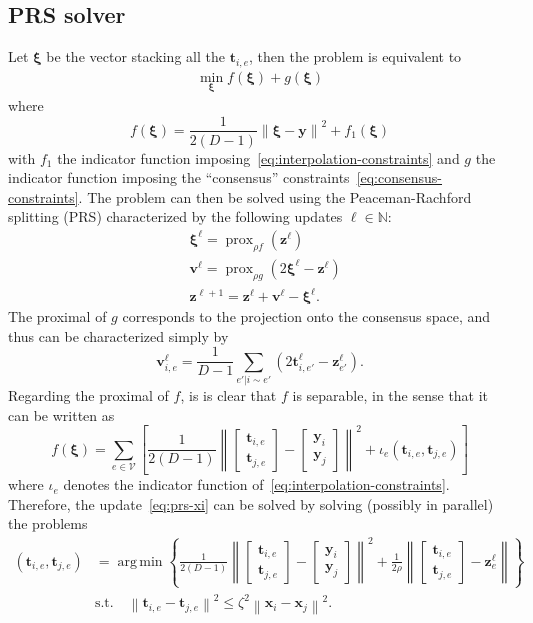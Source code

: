 \documentclass{article}
\DeclareMathOperator*{\argmin}{arg\,min}
\DeclareMathOperator{\prox}{prox}
\newcommand{\norm}[1]{\left\lVert#1\right\rVert}
\newcommand{\tv}{\mathbold{t}}
\newcommand{\x}{\mathbold{x}}
\newcommand{\y}{\mathbold{y}}
\newcommand{\vv}{\mathbold{v}}
\newcommand{\z}{\mathbold{z}}
\newcommand{\xx}{\pmb{\xi}}
\begin{document}
\subsection{PRS solver}
Let $\xx$ be the vector stacking all the $\tv_{i,e}$, then the problem is equivalent to
\begin{align*}
	\min_{\xx} f(\xx) + g(\xx)
\end{align*}
where
$$
	f(\xx) = \frac{1}{2(D-1)} \norm{\xx - \y}^2 + f_1(\xx)
$$
with $f_1$ the indicator function imposing~\eqref{eq:interpolation-constraints} and $g$ the indicator function imposing the ``consensus'' constraints~\eqref{eq:consensus-constraints}. The problem can then be solved using the Peaceman-Rachford splitting (PRS) characterized by the following updates $\ell \in \mathbb{N}$:
\begin{subequations}
\begin{align}
	&\xx^\ell = \prox_{\rho f}(\z^\ell) \label{eq:prs-xi} \\
	&\vv^\ell = \prox_{\rho g}(2 \xx^\ell - \z^\ell) \\
	&\z^{\ell+1} = \z^\ell + \vv^\ell - \xx^\ell.
\end{align}
\end{subequations}
The proximal of $g$ corresponds to the projection onto the consensus space, and thus can be characterized simply by
$$
	\vv_{i,e}^\ell = \frac{1}{D-1} \sum_{e' | i \sim e'} \left( 2 \tv_{i,e'}^\ell - \z_{e'}^\ell\right).
$$
Regarding the proximal of $f$, is is clear that $f$ is separable, in the sense that it can be written as
$$
	f(\xx) = \sum_{e \in \mathcal{V}} \left[ \frac{1}{2 (D-1)} \norm{\begin{bmatrix} \tv_{i,e} \\ \tv_{j,e} \end{bmatrix} - \begin{bmatrix} \y_i \\ \y_j \end{bmatrix}}^2 + \iota_{e}(\tv_{i,e},\tv_{j,e}) \right]
$$
where $\iota_{e}$ denotes the indicator function of~\eqref{eq:interpolation-constraints}. Therefore, the update~\eqref{eq:prs-xi} can be solved by solving (possibly in parallel) the problems
\begin{equation}\label{eq:local-updates}
\begin{split}
	(\tv_{i,e},\tv_{j,e}) &= \argmin \left\{ \frac{1}{2 (D-1)} \norm{\begin{bmatrix} \tv_{i,e} \\ \tv_{j,e} \end{bmatrix} - \begin{bmatrix} \y_i \\ \y_j \end{bmatrix}}^2 + \frac{1}{2\rho} \norm{\begin{bmatrix} \tv_{i,e} \\ \tv_{j,e} \end{bmatrix} - \z_e^\ell} \right\}\\
	&\text{s.t.} \quad \norm{\tv_{i,e} - \tv_{j,e}}^2 \leq \zeta^2 \norm{\x_i - \x_j}^2.
\end{split}
\end{equation}
\end{document}
